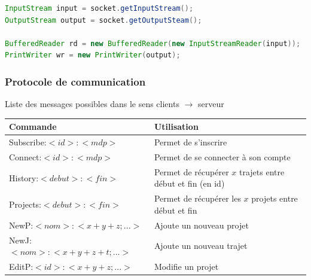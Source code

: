 \begin{lstlisting}[language=Java]
InputStream input = socket.getInputStream();
OutputStream output = socket.getOutputSteam();

BufferedReader rd = new BufferedReader(new InputStreamReader(input));
PrintWriter wr = new PrintWriter(output);
\end{lstlisting}

\subsubsection{Protocole de communication}
    \begin{center}
        Liste des messages possibles dans le sens clients $\rightarrow$ serveur
        \par
        \begin{tabular}{|l|l|}
            \hline
            Commande & Utilisation\\
            \hline
            Subscribe:$<id>:<mdp>$ & Permet de s'inscrire\\
            \hline
            Connect:$<id>:<mdp>$ & Permet de se connecter à son compte\\
            \hline
            \hline
            History:$<debut>:<fin>$ & Permet de récupérer $x$ trajets entre début et fin (en id)\\
            \hline
            Projects:$<debut>:<fin>$ & Permet de récupérer les $x$ projets entre début et fin\\
            \hline
            \hline
            NewP:$<nom>:<x+y+z;...>$ & Ajoute un nouveau projet\\
            \hline
            NewJ:$<nom>:<x+y+z+t;...>$ & Ajoute un nouveau trajet\\
            \hline
            EditP:$<id>:<x+y+z;...>$ & Modifie un projet\\
            \hline
        \end{tabular}
    \end{center}
